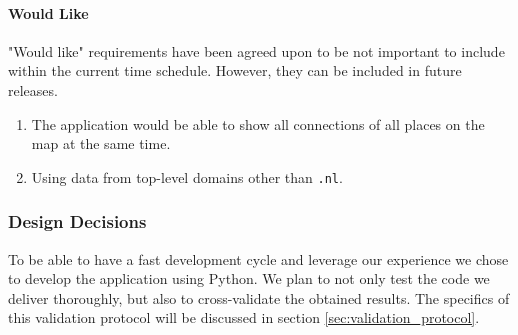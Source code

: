 \paragraph {Would Like}
"Would like" requirements have been agreed upon to be not important to include within the current time schedule. However, they can be included in future releases.

\begin{enumerate}
    \item The application would be able to show all connections of all places on the map at the same time.
    \item Using data from top-level domains other than \texttt{.nl}.
\end{enumerate}

\subsubsection{Design Decisions}
To be able to have a fast development cycle and leverage our experience we chose to develop the application using Python. 
We plan to not only test the code we deliver thoroughly, but also to cross-validate the obtained results. The specifics of this validation protocol will be discussed in section \ref{sec:validation_protocol}.